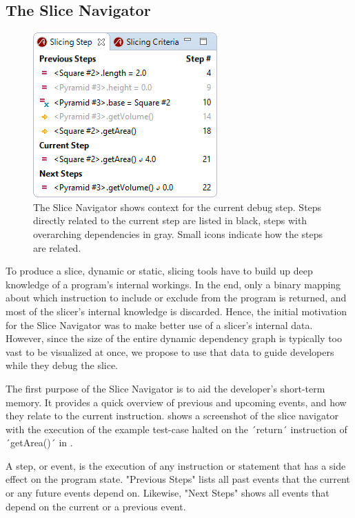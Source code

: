 \documentclass[
			english,
			review,
			]{elsarticle}
\begin{document}
\subsection{The Slice Navigator}
\label{sec:the_slice_navigator}

\begin{figure}
	\centering
		\includegraphics[width=0.40\linewidth]{slice1.png}
	\caption{The Slice Navigator shows context for the current debug step. Steps directly related to the current step are listed in black, steps with overarching dependencies in gray. Small icons indicate how the steps are related.}
	\label{fig:slice1}
\end{figure}

To produce a slice, dynamic or static, slicing tools have to build up deep knowledge of a program's internal workings.
In the end, only a binary mapping about which instruction to include or exclude from the program is returned, and most of the slicer's internal knowledge is discarded.
Hence, the initial motivation for the Slice Navigator was to make better use of a slicer's internal data.
However, since the size of the entire dynamic dependency graph is typically too vast to be visualized at once, we propose to use that data to guide developers while they debug the slice.

The first purpose of the Slice Navigator is to aid the developer's short-term memory.
It provides a quick overview of previous and upcoming events, and how they relate to the current instruction.
 shows a screenshot of the slice navigator with the execution of the example test-case halted on the ´return´ instruction of ´getArea()´ in .

A step, or event, is the execution of any instruction or statement that has a side effect on the program state.
"Previous Steps" lists all past events that the current or any future events depend on.
Likewise, "Next Steps" shows all events that depend on the current or a previous event.
\end{document}
